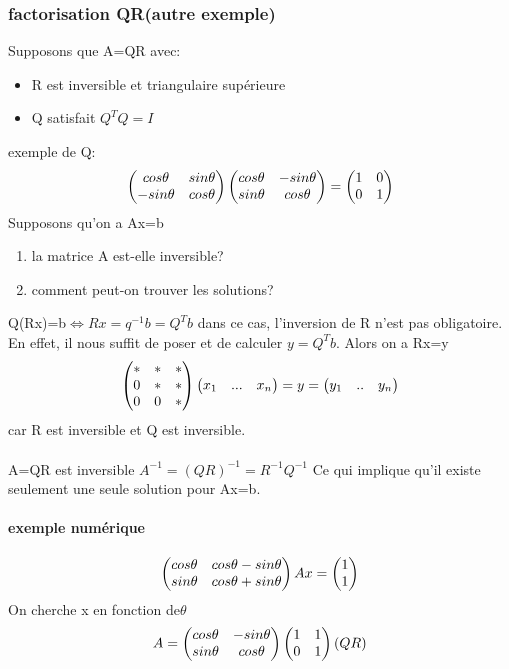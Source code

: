 \documentclass[a4paper,10pt]{article}
\begin{document}
\subsubsection{factorisation QR(autre exemple)}
Supposons que A=QR avec:
\begin{itemize}
 \item R est inversible et triangulaire supérieure
 \item Q satisfait $Q^{T}Q=I$
\end{itemize}
exemple de Q:
\[
\begin{pmatrix}
cos\theta&sin\theta\cr
-sin\theta&cos\theta\cr
\end{pmatrix}
\begin{pmatrix}
cos\theta&-sin\theta\cr
sin\theta&cos\theta\cr
\end{pmatrix}
=
\begin{pmatrix}
1&0\cr
0&1\cr
\end{pmatrix}
\]
\newline
Supposons qu'on a Ax=b
\begin{enumerate}
 \item la matrice A est-elle inversible?
 \item comment peut-on trouver les solutions?
\end{enumerate}
Q(Rx)=b$\Leftrightarrow Rx=q^{-1}b=Q^{T}b$
\newline
dans ce cas, l'inversion de R n'est pas obligatoire. En effet, il nous suffit de poser et de calculer $y=Q^Tb$.
\newline
Alors on a Rx=y
\[
\begin{pmatrix}
*&*&*\cr
0&*&*\cr
0&0&*\cr
\end{pmatrix}
\begin{pmatrix}
x_1&...&x_n\cr
\end{pmatrix}
=y=
\begin{pmatrix}
y_1&..&y_n\cr
\end{pmatrix}
\]
car R est inversible et Q est inversible.
\paragraph{}
A=QR est inversible $A^{-1}=(QR)^{-1}=R^{-1}Q^{-1}$
\newline
Ce qui implique qu'il existe seulement une seule solution pour Ax=b.
\paragraph{exemple numérique}
\[
\begin{pmatrix}
cos\theta&cos\theta-sin\theta\cr
sin\theta&cos\theta+sin\theta\cr
\end{pmatrix}
Ax=\begin{pmatrix}
1\cr
1\cr
\end{pmatrix}
\]
On cherche x en fonction de$\theta$
\[A=
\begin{pmatrix}
cos\theta&-sin\theta\cr
sin\theta&cos\theta\cr
\end{pmatrix}
\begin{pmatrix}
1&1\cr
0&1\cr
\end{pmatrix}
(QR)
\]
\end{document}

